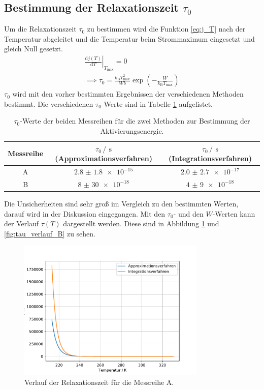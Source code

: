 \subsection{Bestimmung der Relaxationszeit \texorpdfstring{$\tau_{0}$}{T1}}
Um die Relaxationszeit $\tau_{0}$ zu bestimmen wird die Funktion \eqref{eq:j_T} nach der Temperatur abgeleitet und 
die Temperatur beim Strommaximum eingesetzt und gleich Null gesetzt.
\begin{gather*}
    \left.\frac{\text{d}j(T)}{\text{d}T}\right|_{T_{\text{max}}}=0\\
    \implies \tau_0 = \frac{k_{\text{B}}T_{\text{max}}^2}{Wb}\exp{\left(-\frac{W}{k_{\text{B}}T_{\text{max}}}\right)}
\end{gather*}
$\tau_0$ wird mit den vorher bestimmten Ergebnissen der verschiedenen Methoden bestimmt.
Die verschiedenen $\tau_0$-Werte sind in Tabelle \ref{tab:tau_0} aufgelistet.
\FloatBarrier
\begin{table}
    \centering
    \caption{$\tau_0$-Werte der beiden Messreihen für die zwei Methoden zur Bestimmung der Aktivierungsenergie.}
    \label{tab:tau_0}
    \begin{tabular}{c c c}
        \toprule
        Messreihe&$\tau_0\,/\,\SI{}{\second}$ (Approximationsverfahren)&$\tau_0\,/\,\SI{}{\second}$ (Integrationsverfahren)\\
        \midrule
        A&$\num{2.8(18)e-15}$&$\num{2.0(27)e-17}$\\
        B&$\num{8(30)e-18}$&$\num{4(9)e-18}$\\
        \bottomrule
    \end{tabular}
\end{table}
\FloatBarrier
Die Unsicherheiten sind sehr groß im Vergleich zu den bestimmten Werten, darauf wird in der Diskussion eingegangen.
Mit den $\tau_0$- und den $W$-Werten kann der Verlauf $\tau(T)$ dargestellt werden.
Diese sind in Abbildung \ref{fig:tau_verlauf_A} und \ref{fig:tau_verlauf_B} zu sehen.
\FloatBarrier
\begin{figure}
    \centering
    \includegraphics[width = 0.8\textwidth , keepaspectratio]{figure/tau_verlauf_A.pdf}
    \caption{Verlauf der Relaxationszeit für die Messreihe A.}
    \label{fig:tau_verlauf_A}
\end{figure}
